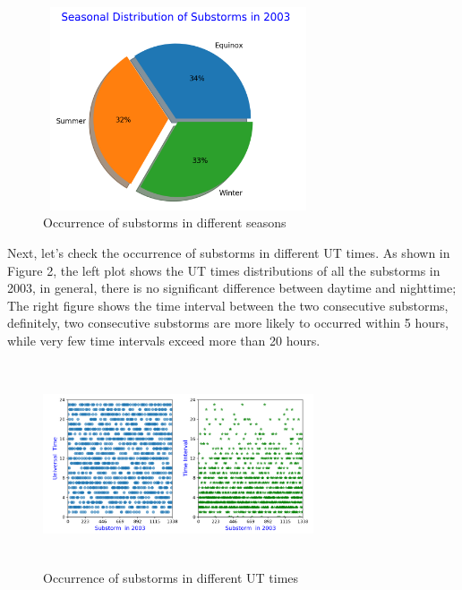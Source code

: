 \documentclass[12pt, letterpaper]{article} %
\begin{document}
\begin{figure}[!t] %
\begin{center} %
  \includegraphics[width=8cm,height=6cm]{seasonal_distribution.png} %
  \caption{Occurrence of substorms in different seasons} %
  \label{fig:1} %
\end{center} %
\end{figure} %

Next, let's check the occurrence of substorms in different UT times. As shown in Figure 2, the left plot shows the UT times distributions of all the substorms in 2003, in general, there is no significant difference between daytime and nighttime; The right figure shows the time interval between the two consecutive substorms, definitely, two consecutive substorms are more likely to occurred within 5 hours, while very few time intervals exceed more than 20 hours.

\begin{figure}[!t] %
\begin{center} %
  \includegraphics[width=8cm,height=6cm]{Time Interval.png} %
  \caption{Occurrence of substorms in different UT times} %
  \label{fig:2} %
\end{center} %
\end{figure} %
\end{document}
